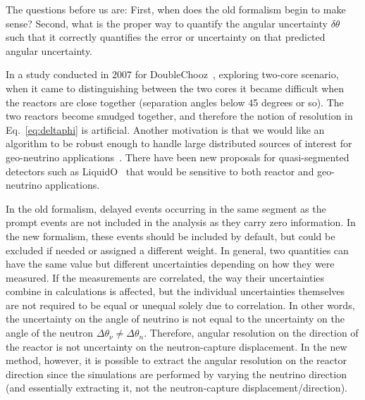 \documentclass[tightenlines,
twocolumn,prl,notitlepage,nofootinbib,preprintnumbers,longbibliography]{revtex4-1}
\begin{document}
The questions before us are: First, when does the old formalism begin to make sense? Second, what is the proper way to quantify the angular uncertainty $\delta \theta$ such that it correctly quantifies the error or uncertainty on that predicted angular uncertainty. 

In a study conducted in 2007 for DoubleChooz~\cite{DC2007}, exploring two-core scenario, when it came to distinguishing between the two cores it became  difficult when the reactors are close together (separation angles below 45 degrees or so).
The two reactors become smudged together, and therefore the notion of resolution in Eq.~\ref{eq:deltaphi} is artificial. 
Another motivation is that we would like an algorithm  to be robust enough to handle large distributed sources of interest for geo-neutrino applications~\cite{Watanabe:2014}.
There have been new proposals for quasi-segmented detectors such as LiquidO~\cite{LiquidOConsortium:2023bqe} that would be sensitive to both reactor and geo-neutrino applications. %

In the old formalism, delayed events occurring in the same segment as the prompt events are not included in the analysis as they carry zero information. In the new formalism, these events should be included by default, but could be excluded if needed or assigned a different weight.
In general, two quantities can have the same value but different uncertainties depending on how they were measured. If the measurements are correlated, the way their uncertainties combine in calculations is affected, but the individual uncertainties themselves are not required to be equal or unequal solely due to correlation. In other words, the uncertainty on the angle of neutrino is not equal to the uncertainty on the angle of the neutron $\Delta \theta_\nu \ne \Delta \theta_n$. Therefore, angular resolution on the direction of the reactor is not  uncertainty on the neutron-capture displacement. In the new method, however, it is possible to extract the angular resolution on the reactor direction since the simulations are performed by varying the neutrino direction (and essentially extracting it, not the neutron-capture displacement/direction).
\end{document}
